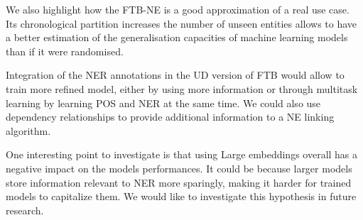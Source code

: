 We also highlight how the FTB-NE is a good approximation of a real use case. Its chronological partition increases the number of unseen entities allows to have a better estimation of the generalisation capacities of machine learning models than if it were randomised.

Integration of the NER annotations in the UD version of FTB would allow to train more refined model, either by using more information or through multitask learning by learning POS and NER at the same time. We could also use dependency relationships to provide additional information to a NE linking algorithm.

One interesting point to investigate is that using Large embeddings overall has a negative impact on the models performances. It could be because larger models store information relevant to NER more sparingly, making it harder for trained models to capitalize them. We would like to investigate this hypothesis in future research.

